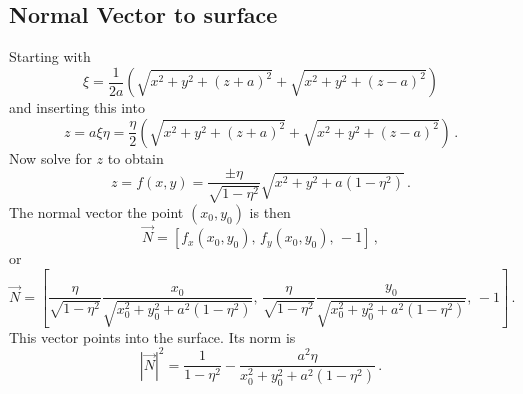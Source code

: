 \documentclass[a4paper,10pt]{article}
\newcommand{\ud}{\mathrm{d}}
\begin{document}
\subsection{Normal Vector to surface}
  Starting with
  \begin{equation}
    \xi = \frac{1}{2a}\left( \sqrt{x^2 + y^2 + (z+a)^2} + \sqrt{x^2 + y^2 + (z-a)^2} \right)
  \end{equation}
  and inserting this into
  \begin{equation}
    z = a\xi\eta = \frac{\eta}{2} \left( \sqrt{x^2 + y^2 + (z+a)^2} + \sqrt{x^2 + y^2 + (z-a)^2} \right)\, .
  \end{equation}
  Now solve for \(z\) to obtain
  \begin{equation}
   z = f(x,y) = \frac{\pm\eta}{\sqrt{1-\eta^2}} \sqrt{x^2 + y^2 + a(1-\eta^2)}\, .
  \end{equation}
  The normal vector the point \((x_0, y_0)\) is then
  \begin{equation}
    \vec{N} = [f_x(x_0, y_0),\, f_y(x_0, y_0),\, -1]\, ,
  \end{equation}
  or
  \begin{equation}
   \vec{N} = \left[\frac{\eta}{\sqrt{1-\eta^2}} \frac{x_0}{\sqrt{x_0^2 + y_0^2 + a^2(1-\eta^2)}},\, \frac{\eta}{\sqrt{1-\eta^2}} \frac{y_0}{\sqrt{x_0^2 + y_0^2 + a^2(1-\eta^2)}},\, -1\right]\, .
  \end{equation}
  This vector points into the surface. Its norm is
  \begin{equation}
   |\vec{N}|^2 = \frac{1}{1-\eta^2} - \frac{a^2\eta}{x_0^2 + y_0^2 + a^2(1-\eta^2)}\, .
  \end{equation}
%
\end{document}
